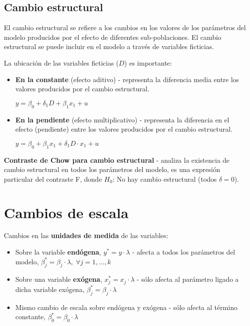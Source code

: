 \documentclass[10pt, a4paper, landscape]{extarticle}
\begin{document}
\begin{multicols}{3}
\subsection*{Cambio estructural}

El cambio estructural se refiere a los cambios en los valores de los parámetros del modelo producidos por el efecto de diferentes sub-poblaciones. El cambio estructural se puede incluir en el modelo a través de variables ficticias.

La ubicación de las variables ficticias ($D$) es importante:

\begin{itemize}[leftmargin=*]
	\item \textbf{En la constante} (efecto aditivo) - representa la diferencia media entre los valores producidos por el cambio estructural.
	\begin{center}
		$y = \beta_0 + \delta_1 D + \beta_1 x_1 + u$
	\end{center}
	\item \textbf{En la pendiente} (efecto multiplicativo) - representa la diferencia en el efecto (pendiente) entre los valores producidos por el cambio estructural.
	\begin{center}
		$y = \beta_0 + \beta_1 x_1 + \delta_1 D \cdot x_1 + u$
	\end{center}
\end{itemize}

\textbf{Contraste de Chow para cambio estructural} - analiza la existencia de cambio estructural en todos los parámetros del modelo, es una expresión particular del contraste F, donde $H_0$: No hay cambio estructural (todos $\delta = 0$).

\section*{Cambios de escala}

Cambios en las \textbf{unidades de medida} de las variables:

\begin{itemize}[leftmargin=*]
	\item Sobre la variable \textbf{endógena}, $y^* = y \cdot \lambda$ - afecta a todos los parámetros del modelo, $\beta_j^* = \beta_j \cdot \lambda, \; \forall j = 1, \ldots, k$
	\item Sobre una variable \textbf{exógena}, $x_j^* = x_j \cdot \lambda$ - sólo afecta al parámetro ligado a dicha variable exógena, $\beta_j^* = \beta_j \cdot \lambda$
	\item Mismo cambio de escala sobre endógena y exógena - sólo afecta al término constante, $\beta_0^* = \beta_0 \cdot \lambda$
\end{itemize}


\end{multicols}
\end{document}
